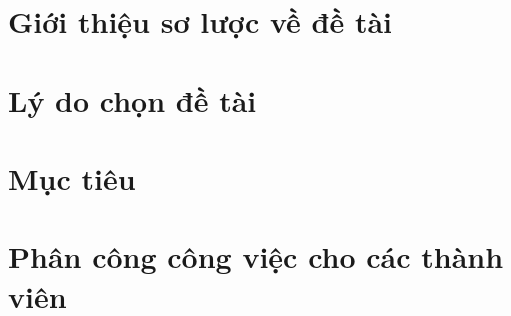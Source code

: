 \section{Giới thiệu sơ lược về đề tài}



\section{Lý do chọn đề tài}



\section{Mục tiêu}



\section{Phân công công việc cho các thành viên}
